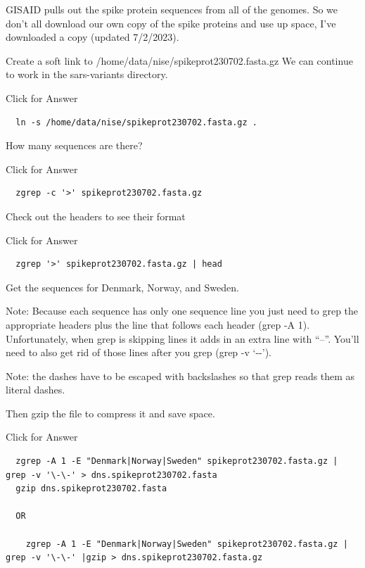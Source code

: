 \documentclass[
]{book}
\begin{document}
GISAID pulls out the spike protein sequences from all of the genomes. So we don't all download our own copy of the spike proteins and use up space, I've downloaded a copy (updated 7/2/2023).

Create a soft link to /home/data/nise/spikeprot230702.fasta.gz
We can continue to work in the sars-variants directory.

Click for Answer

\begin{verbatim}
  ln -s /home/data/nise/spikeprot230702.fasta.gz .
\end{verbatim}

\hfill\break

How many sequences are there?

Click for Answer

\begin{verbatim}
  zgrep -c '>' spikeprot230702.fasta.gz
\end{verbatim}

\hfill\break

Check out the headers to see their format

Click for Answer

\begin{verbatim}
  zgrep '>' spikeprot230702.fasta.gz | head
\end{verbatim}

\hfill\break

Get the sequences for Denmark, Norway, and Sweden.

Note: Because each sequence has only one sequence line you just need to grep the appropriate headers plus the line that follows each header (grep -A 1). Unfortunately, when grep is skipping lines it adds in an extra line with ``--''. You'll need to also get rid of those lines after you grep (grep -v `-\/-').

Note: the dashes have to be escaped with backslashes so that grep reads them as literal dashes.

Then gzip the file to compress it and save space.

Click for Answer

\begin{verbatim}
  zgrep -A 1 -E "Denmark|Norway|Sweden" spikeprot230702.fasta.gz | grep -v '\-\-' > dns.spikeprot230702.fasta
  gzip dns.spikeprot230702.fasta
  
  OR
  
    zgrep -A 1 -E "Denmark|Norway|Sweden" spikeprot230702.fasta.gz | grep -v '\-\-' |gzip > dns.spikeprot230702.fasta.gz
\end{verbatim}
\end{document}
